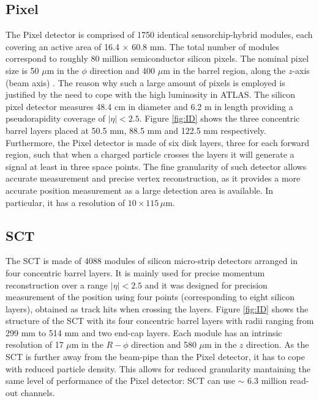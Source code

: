 			\subsection*{Pixel}
				
				The Pixel detector is comprised of 1750 identical sensorchip-hybrid modules, each covering an active area of 16.4 $\times$ 60.8 mm. The total number of modules correspond to roughly 80 million semiconductor silicon pixels. The nominal pixel size is 50 $\mu$m in the $\phi$ direction and 400 $\mu$m in the barrel region, along the $z$-axis (beam axis) \cite{ATLASPix}. The reason why such a large amount of pixels is employed is justified by the need to cope with the high luminosity in ATLAS. The silicon pixel detector measures 48.4 cm in diameter and 6.2 m in length providing a pseudorapidity coverage of $\left|\eta\right| < 2.5$. Figure \ref{fig:ID} shows the three concentric barrel layers placed at 50.5 mm, 88.5 mm and 122.5 mm respectively. Furthermore, the Pixel detector is made of six disk layers, three for each forward region, such that when a charged particle crosses the layers it will generate a signal at least in three space points. The fine granularity of such detector allows accurate measurement and precise vertex reconstruction, as it provides a more accurate position measurement as a large detection area is available. In particular, it has a resolution of $10 \times 115\,\mu$m.

			\subsection*{SCT}

				The SCT is made of 4088 modules of silicon micro-strip detectors arranged in four concentric barrel layers. It is mainly used for precise momentum reconstruction over a range $\left|\eta\right| < 2.5$ and it was designed for precision measurement of the position using four points (corresponding to eight silicon layers), obtained as track hits when crossing the layers. Figure \ref{fig:ID} shows the structure of the SCT with its four concentric barrel layers with radii ranging from 299 mm to 514 mm and two end-cap layers. Each module has an intrinsic resolution of 17 $\mu$m in the $R-\phi$ direction and 580 $\mu$m in the $z$ direction. As the SCT is further away from the beam-pipe than the Pixel detector, it has to cope with reduced particle density. This allows for reduced granularity mantaining the same level of performance of the Pixel detector: SCT can use $\sim$ 6.3 million read-out channels.%


